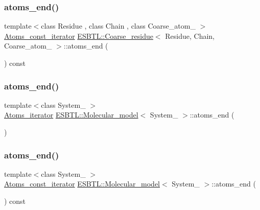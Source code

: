 \subsubsection{\texorpdfstring{atoms\+\_\+end()}{atoms\_end()}\hspace{0.1cm}{\footnotesize\ttfamily [2/8]}}
{\footnotesize\ttfamily template$<$class Residue , class Chain , class Coarse\+\_\+atom\+\_\+ $>$ \\
\hyperlink{group__grp__iters_gabb95e73700fd84dbde6e089927e03a6d}{Atoms\+\_\+const\+\_\+iterator} \hyperlink{classESBTL_1_1Coarse__residue}{E\+S\+B\+T\+L\+::\+Coarse\+\_\+residue}$<$ Residue, Chain, Coarse\+\_\+atom\+\_\+ $>$\+::atoms\+\_\+end (\begin{DoxyParamCaption}{ }\end{DoxyParamCaption}) const\hspace{0.3cm}{\ttfamily [inline]}}

\mbox{\label{group__grp__iters_ga973ddac842fe62aa21ad96eda78dc155}} 
\subsubsection{\texorpdfstring{atoms\+\_\+end()}{atoms\_end()}\hspace{0.1cm}{\footnotesize\ttfamily [3/8]}}
{\footnotesize\ttfamily template$<$class System\+\_\+ $>$ \\
\hyperlink{group__grp__iters_ga458a89ea78f235b807ca0d2dfd9a0427}{Atoms\+\_\+iterator} \hyperlink{classESBTL_1_1Molecular__model}{E\+S\+B\+T\+L\+::\+Molecular\+\_\+model}$<$ System\+\_\+ $>$\+::atoms\+\_\+end (\begin{DoxyParamCaption}{ }\end{DoxyParamCaption})\hspace{0.3cm}{\ttfamily [inline]}}

\mbox{\label{group__grp__iters_ga3c2c120f4056069a1767456fe31de5b5}} 
\subsubsection{\texorpdfstring{atoms\+\_\+end()}{atoms\_end()}\hspace{0.1cm}{\footnotesize\ttfamily [4/8]}}
{\footnotesize\ttfamily template$<$class System\+\_\+ $>$ \\
\hyperlink{group__grp__iters_ga41096063f109fca33976a17af4b3a1e4}{Atoms\+\_\+const\+\_\+iterator} \hyperlink{classESBTL_1_1Molecular__model}{E\+S\+B\+T\+L\+::\+Molecular\+\_\+model}$<$ System\+\_\+ $>$\+::atoms\+\_\+end (\begin{DoxyParamCaption}{ }\end{DoxyParamCaption}) const\hspace{0.3cm}{\ttfamily [inline]}}

